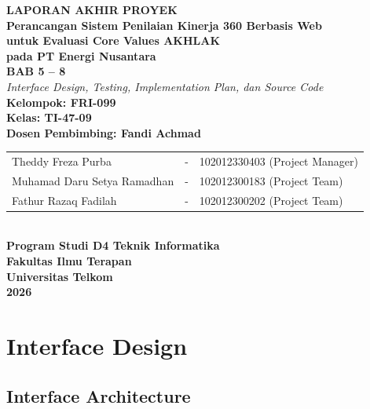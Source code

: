 \documentclass[12pt,a4paper,oneside]{report}
\begin{document}
\begin{titlepage}
\begin{center}
  \vspace*{2cm}
  \textbf{\LARGE LAPORAN AKHIR PROYEK}\\[0.5cm]
  \textbf{\Large Perancangan Sistem Penilaian Kinerja 360\textdegree{} Berbasis Web}\\[0.3cm]
  \textbf{\Large untuk Evaluasi Core Values AKHLAK}\\[0.3cm]
  \textbf{\Large pada PT Energi Nusantara}\\[1.5cm]

  \textbf{\Large BAB 5 -- 8}\\[0.5cm]
  \textit{Interface Design, Testing, Implementation Plan, dan Source Code}\\[2cm]

  \textbf{Kelompok: FRI-099}\\[0.5cm]
  \textbf{Kelas: TI-47-09}\\[0.5cm]
  \textbf{Dosen Pembimbing: Fandi Achmad}\\[2cm]

  \begin{tabular}{lcl}
    Theddy Freza Purba & - & 102012330403 (Project Manager) \\
    Muhamad Daru Setya Ramadhan & - & 102012300183 (Project Team) \\
    Fathur Razaq Fadilah & - & 102012300202 (Project Team) \\
  \end{tabular}\\[2cm]

  \textbf{Program Studi D4 Teknik Informatika}\\
  \textbf{Fakultas Ilmu Terapan}\\
  \textbf{Universitas Telkom}\\
  \textbf{2026}
\end{center}
\end{titlepage}

\tableofcontents
\newpage

\chapter{Interface Design}

\section{Interface Architecture}
\end{document}
